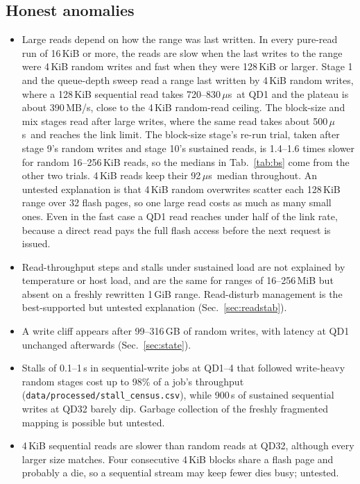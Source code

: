 \documentclass{article}
\newcommand{\us}{\,$\mu$s}
\begin{document}
\subsection{Honest anomalies}\label{sec:anomalies}
\begin{itemize}
  \item Large reads depend on how the range was last written. In every pure-read run of 16\,KiB or more, the reads are slow when the last writes to the range were 4\,KiB random writes and fast when they were 128\,KiB or larger. Stage 1 and the queue-depth sweep read a range last written by 4\,KiB random writes, where a 128\,KiB sequential read takes 720--830\us\ at QD1 and the plateau is about 390\,MB/s, close to the 4\,KiB random-read ceiling. The block-size and mix stages read after large writes, where the same read takes about 500\us\ and reaches the link limit. The block-size stage's re-run trial, taken after stage 9's random writes and stage 10's sustained reads, is 1.4--1.6 times slower for random 16--256\,KiB reads, so the medians in Tab.~\ref{tab:bs} come from the other two trials. 4\,KiB reads keep their 92\us\ median throughout. An untested explanation is that 4\,KiB random overwrites scatter each 128\,KiB range over 32 flash pages, so one large read costs as much as many small ones. Even in the fast case a QD1 read reaches under half of the link rate, because a direct read pays the full flash access before the next request is issued.
  \item Read-throughput steps and stalls under sustained load are not explained by temperature or host load, and are the same for ranges of 16--256\,MiB but absent on a freshly rewritten 1\,GiB range. Read-disturb management is the best-supported but untested explanation (Sec.~\ref{sec:readstab}).
  \item A write cliff appears after 99--316\,GB of random writes, with latency at QD1 unchanged afterwards (Sec.~\ref{sec:state}).
  \item Stalls of 0.1--1\,s in sequential-write jobs at QD1--4 that followed write-heavy random stages cost up to 98\% of a job's throughput (\nolinkurl{data/processed/stall_census.csv}), while 900\,s of sustained sequential writes at QD32 barely dip. Garbage collection of the freshly fragmented mapping is possible but untested.
  \item 4\,KiB sequential reads are slower than random reads at QD32, although every larger size matches. Four consecutive 4\,KiB blocks share a flash page and probably a die, so a sequential stream may keep fewer dies busy; untested.

\end{itemize}
\end{document}
